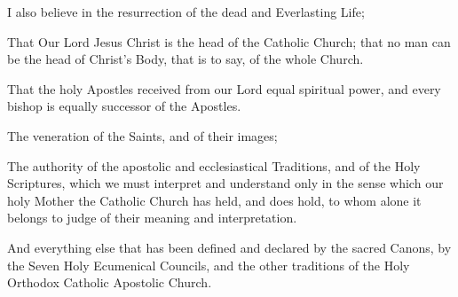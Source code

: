 I also believe in 
the resurrection of the dead and Everlasting Life;

That Our Lord Jesus Christ is the head of the Catholic Church; that no man can be the head of Christ's Body, that is to say, of the whole Church.

That the holy Apostles received from our Lord equal spiritual power, and every bishop is equally successor of the Apostles.

The veneration of the Saints, and of their images;

The authority of the apostolic and ecclesiastical Traditions, and of the Holy Scriptures, which we must interpret and understand only in the sense which our holy Mother the Catholic Church has held, and does hold, to whom alone it belongs to judge of their meaning and interpretation.

And everything else that has been defined and declared by the sacred Canons, by the 
Seven Holy Ecumenical Councils, and the other traditions of the Holy Orthodox Catholic Apostolic Church.%

